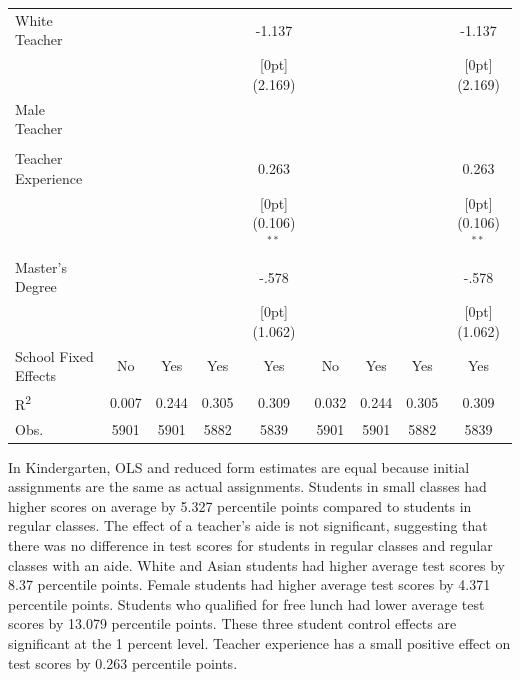 \documentclass[a4paper,11pt]{article}
\begin{document}
\begin{table}[H]
\begin{tabular*}{\textwidth}{@{\extracolsep{\fill}}lcccccccc}
	White Teacher &	&	&	&	-1.137  &	&	&	&	-1.137\\
	&	&	&	&	\raisebox{.7ex}[0pt]{\scriptsize (2.169)} 	&	&	&	&	\raisebox{.7ex}[0pt]{\scriptsize (2.169)} \\
	Male Teacher &	&	&	&	 &	&	&	&	\\
	&	&	&	& &	&	&	&		\\
	Teacher Experience &	&	&	&	0.263  &	&	&	&	0.263 \\
	&	&	&	&	\raisebox{.7ex}[0pt]{\scriptsize (0.106)$^{**}$} 	&	&	&	&	\raisebox{.7ex}[0pt]{\scriptsize (0.106)$^{**}$}\\
	Master's Degree &	&	&	&	-.578 &	&	&	&	-.578\\
	&	&	&	&	\raisebox{.7ex}[0pt]{\scriptsize (1.062)}&	&	&	&	\raisebox{.7ex}[0pt]{\scriptsize (1.062)} \\
	School Fixed Effects &	No  & Yes &	Yes & Yes &	No & Yes &	Yes & Yes \\
	R\textsuperscript{2} & 0.007 & 0.244 & 0.305 & 0.309 & 0.032 & 0.244 & 0.305 & 0.309\\
	Obs. &	5901 &	5901 &	5882 &	5839  &	5901 &	5901 &	5882 &	5839 \\
	\hline\hline				
\end{tabular*}		
\end{table}		

In Kindergarten, OLS and reduced form estimates are equal because initial assignments are the same as actual assignments. Students in small classes had higher scores on average by 5.327 percentile points compared to students in regular classes. The effect of a teacher's aide is not significant, suggesting that there was no difference in test scores for students in regular classes and regular classes with an aide. White and Asian students had higher average test scores by 8.37 percentile points. Female students had higher average test scores by 4.371 percentile points. Students who qualified for free lunch had lower average test scores by 13.079 percentile  points. These three student control effects are significant at the 1 percent level. Teacher experience has a small positive effect on test scores by 0.263 percentile points. \par
\end{document}
